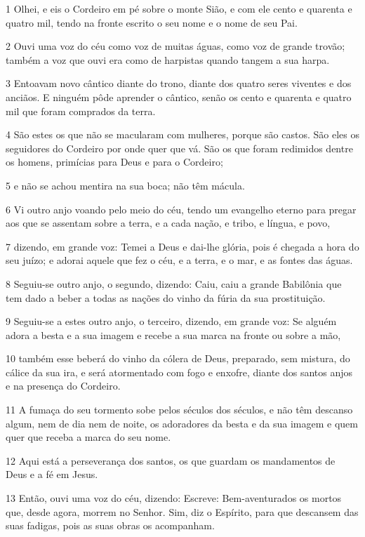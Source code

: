 \par 1 Olhei, e eis o Cordeiro em pé sobre o monte Sião, e com ele cento e quarenta e quatro mil, tendo na fronte escrito o seu nome e o nome de seu Pai.
\par 2 Ouvi uma voz do céu como voz de muitas águas, como voz de grande trovão; também a voz que ouvi era como de harpistas quando tangem a sua harpa.
\par 3 Entoavam novo cântico diante do trono, diante dos quatro seres viventes e dos anciãos. E ninguém pôde aprender o cântico, senão os cento e quarenta e quatro mil que foram comprados da terra.
\par 4 São estes os que não se macularam com mulheres, porque são castos. São eles os seguidores do Cordeiro por onde quer que vá. São os que foram redimidos dentre os homens, primícias para Deus e para o Cordeiro;
\par 5 e não se achou mentira na sua boca; não têm mácula.
\par 6 Vi outro anjo voando pelo meio do céu, tendo um evangelho eterno para pregar aos que se assentam sobre a terra, e a cada nação, e tribo, e língua, e povo,
\par 7 dizendo, em grande voz: Temei a Deus e dai-lhe glória, pois é chegada a hora do seu juízo; e adorai aquele que fez o céu, e a terra, e o mar, e as fontes das águas.
\par 8 Seguiu-se outro anjo, o segundo, dizendo: Caiu, caiu a grande Babilônia que tem dado a beber a todas as nações do vinho da fúria da sua prostituição.
\par 9 Seguiu-se a estes outro anjo, o terceiro, dizendo, em grande voz: Se alguém adora a besta e a sua imagem e recebe a sua marca na fronte ou sobre a mão,
\par 10 também esse beberá do vinho da cólera de Deus, preparado, sem mistura, do cálice da sua ira, e será atormentado com fogo e enxofre, diante dos santos anjos e na presença do Cordeiro.
\par 11 A fumaça do seu tormento sobe pelos séculos dos séculos, e não têm descanso algum, nem de dia nem de noite, os adoradores da besta e da sua imagem e quem quer que receba a marca do seu nome.
\par 12 Aqui está a perseverança dos santos, os que guardam os mandamentos de Deus e a fé em Jesus.
\par 13 Então, ouvi uma voz do céu, dizendo: Escreve: Bem-aventurados os mortos que, desde agora, morrem no Senhor. Sim, diz o Espírito, para que descansem das suas fadigas, pois as suas obras os acompanham.
